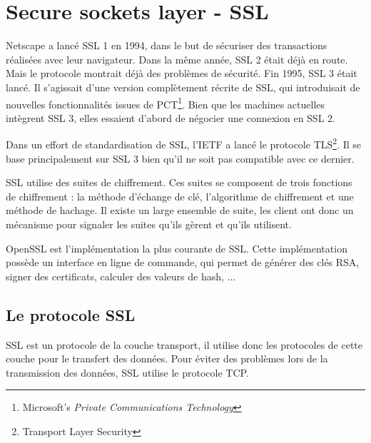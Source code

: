 \section{Secure sockets layer - SSL}
Netscape a lancé SSL 1 en 1994, dans le but de sécuriser des transactions réalisées avec leur navigateur. 
Dans la même année, SSL 2 était déjà en route. 
Mais le protocole montrait déjà des problèmes de sécurité.
Fin 1995, SSL 3 était lancé. 
Il s'agissait d'une version complètement récrite de SSL, qui introduisait de nouvelles fonctionnalités issues de PCT\footnote{Microsoft's \textit{Private Communications Technology}}.
Bien que les machines actuelles intègrent SSL 3, elles essaient d'abord de négocier une connexion en SSL 2.

Dans un effort de standardisation de SSL, l'IETF a lancé le protocole TLS\footnote{Transport Layer Security}.
Il se base principalement sur SSL 3 bien qu'il ne soit pas compatible avec ce dernier.

SSL utilise des suites de chiffrement. Ces suites se composent de trois fonctions de chiffrement : la méthode d'échange de clé, l'algorithme de chiffrement et une méthode de hachage. 
Il existe un large ensemble de suite, les client ont donc un mécanisme pour signaler les suites qu'ils gèrent et qu'ils utilisent. 

OpenSSL est l'implémentation la plus courante de SSL. 
Cette implémentation possède un interface en ligne de commande, qui permet de générer des clés RSA, signer des certificats, calculer des valeurs de hash, ...

\subsection{Le protocole SSL}
SSL est un protocole de la couche transport, il utilise donc les protocoles de cette couche pour le transfert des données. 
Pour éviter des problèmes lors de la transmission des données, SSL utilise le protocole TCP.


